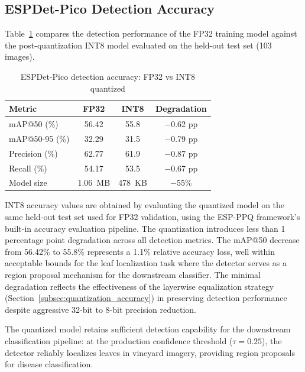 \subsection*{ESPDet-Pico Detection Accuracy}
\label{subsec:espdet_accuracy}

Table~\ref{tab:espdet_accuracy_comparison} compares the detection performance of the FP32 training model against the post-quantization INT8 model evaluated on the held-out test set (103 images).

\begin{table}[htbp]
\centering
\caption{ESPDet-Pico detection accuracy: FP32 vs INT8 quantized}
\label{tab:espdet_accuracy_comparison}
\begin{tabular}{lccc}
\toprule
\textbf{Metric} & \textbf{FP32} & \textbf{INT8} & \textbf{Degradation} \\
\midrule
mAP@50 (\%)         & 56.42 & 55.8  & $-$0.62 pp \\
mAP@50-95 (\%)      & 32.29 & 31.5  & $-$0.79 pp \\
Precision (\%)      & 62.77 & 61.9  & $-$0.87 pp \\
Recall (\%)         & 54.17 & 53.5  & $-$0.67 pp \\
\midrule
Model size          & 1.06~MB & 478~KB & $-$55\% \\
\bottomrule
\end{tabular}
\end{table}

INT8 accuracy values are obtained by evaluating the quantized model on the same held-out test set used for FP32 validation, using the ESP-PPQ framework's built-in accuracy evaluation pipeline. The quantization introduces less than 1 percentage point degradation across all detection metrics. The mAP@50 decrease from 56.42\% to 55.8\% represents a 1.1\% relative accuracy loss, well within acceptable bounds for the leaf localization task where the detector serves as a region proposal mechanism for the downstream classifier. The minimal degradation reflects the effectiveness of the layerwise equalization strategy (Section~\ref{subsec:quantization_accuracy}) in preserving detection performance despite aggressive 32-bit to 8-bit precision reduction.

The quantized model retains sufficient detection capability for the downstream classification pipeline: at the production confidence threshold ($\tau = 0.25$), the detector reliably localizes leaves in vineyard imagery, providing region proposals for disease classification.

